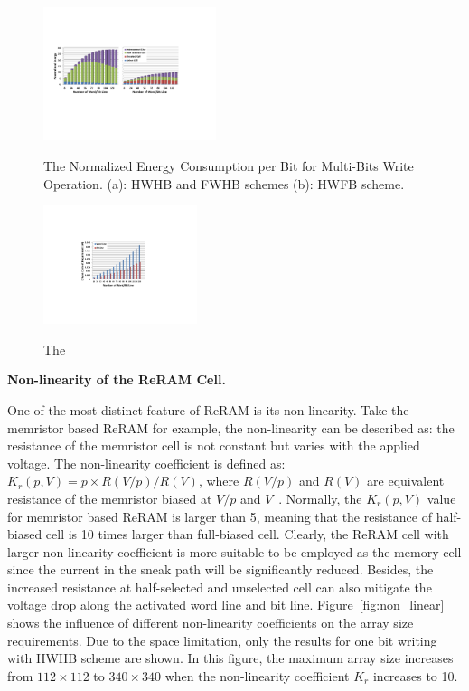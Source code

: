 \begin{figure}%
\centering
  \includegraphics[width=0.45\textwidth]{./figures/multi_energy2.pdf}\\
  \caption{The Normalized Energy Consumption per Bit for Multi-Bits Write Operation. (a): HWHB and  FWHB schemes (b): HWFB scheme. }\label{fig:multi_energy}
\end{figure}


\begin{figure}%
\centering
  \includegraphics[width=0.4\textwidth]{./figures/multi_I2.pdf}\\
  \caption{The }\label{fig:multi_I}
\end{figure}

\vspace{6pt} \textbf{Non-linearity of the ReRAM Cell.} \vspace{6pt}

One of the most distinct feature of ReRAM is its non-linearity. Take the memristor based ReRAM for example, the non-linearity can be described as: the resistance of the memristor cell is not constant but varies with the applied voltage. The non-linearity coefficient is defined as:
$K_r(p,V) = p \times R(V/p)/R(V)$, where $R(V/p)$ and $R(V)$ are equivalent resistance of the memristor biased at $V/p$ and $V$~\cite{memristor:Cong}. Normally, the $K_r(p,V)$ value for memristor based ReRAM is larger than 5, meaning that the resistance of half-biased  cell is 10 times larger than full-biased cell. Clearly, the ReRAM cell with larger non-linearity coefficient is more suitable to be employed as the memory cell since the current in the sneak path will be significantly reduced. Besides, the increased resistance at half-selected and unselected cell can also mitigate the voltage drop along the activated word line and bit line. Figure~\ref{fig:non_linear} shows the influence of different non-linearity coefficients on the array size requirements. Due to the space limitation, only the results for one bit writing with HWHB scheme are shown. In this figure, the maximum array size increases from $112 \times 112$ to $340 \times 340$ when the non-linearity coefficient $K_r$ increases to 10.

